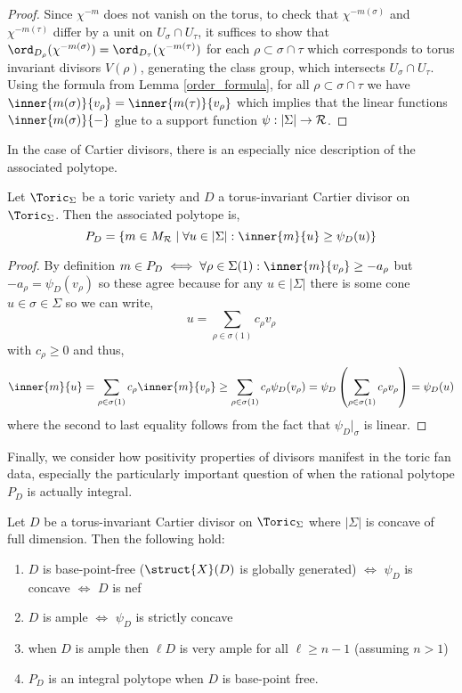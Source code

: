 \begin{proof}
Since $\chi^{-m}$ does not vanish on the torus, to check that $\chi^{-m(\sigma)}$ and $\chi^{-m(\tau)}$ differ by a unit on $U_\sigma \cap U_\tau$, it suffices to show that $\ord_{D_\rho}(\chi^{-m(\sigma)}) = \ord_{D_\tau}(\chi^{-m(\tau)})$ for each $\rho \subset \sigma \cap \tau$ which corresponds to torus invariant divisors $V(\rho)$, generating the class group, which intersects $U_\sigma \cap U_\tau$. Using the formula from Lemma \ref{order_formula}, for all $\rho \subset \sigma \cap \tau$ we have $\inner{m(\sigma)}{v_\rho} = \inner{m(\tau)}{v_\rho}$ which implies that the linear functions $\inner{m(\sigma)}{-}$ glue to a support function $\psi : |\Sigma| \to \mathcal{R}$. 
\end{proof}
\noindent
In the case of Cartier divisors, there is an especially nice description of the associated polytope.

\begin{prop}
Let $\Toric_\Sigma$ be a toric variety and $D$ a torus-invariant Cartier divisor on $\Toric_\Sigma$. Then the associated polytope is,
\[ P_D = \{ m \in M_\R \mid \forall u \in |\Sigma| : \inner{m}{u} \ge \psi_D(u) \} \]
\end{prop}

\begin{proof}
By definition $m \in P_D \iff \forall \rho \in \Sigma(1) : \inner{m}{v_\rho} \ge - a_\rho$ but $-a_\rho = \psi_D(v_\rho)$ so these agree because for any $u \in |\Sigma|$ there is some cone $u \in \sigma \in \Sigma$ so we can write,
\[ u = \sum_{\rho \in \sigma(1)} c_\rho v_\rho \]
with $c_\rho \ge 0$ and thus,
\[ \inner{m}{u} = \sum_{\rho \in \sigma(1)} c_\rho \inner{m}{v_\rho} \ge \sum_{\rho \in \sigma(1)} c_\rho \psi_D(v_\rho) = \psi_D \left( \sum_{\rho \in \sigma(1)} c_\rho v_\rho \right) = \psi_D(u) \]
where the second to last equality follows from the fact that $\psi_D |_\sigma$ is linear. 
\end{proof}
\noindent
Finally, we consider how positivity properties of divisors manifest in the toric fan data, especially the particularly important question of when the rational polytope $P_D$ is actually integral. 


\begin{theorem} \label{divisor_positivity}
Let $D$ be a torus-invariant Cartier divisor on $\Toric_\Sigma$ where $|\Sigma|$ is concave of full dimension. Then the following hold:
\begin{enumerate}
\item $D$ is base-point-free ($\struct{X}(D)$ is globally generated) $\iff$ $\psi_D$ is concave $\iff$ $D$ is nef
\item $D$ is ample $\iff$ $\psi_D$ is strictly concave 
\item when $D$ is ample then $\ell D$ is very ample for all $\ell \ge n - 1$ (assuming $n > 1$)
\item $P_D$ is an integral polytope when $D$ is base-point free. 
\end{enumerate}
\end{theorem}

